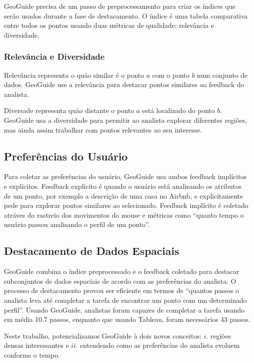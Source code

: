 GeoGuide precisa de um passo de preprocessamento para criar os índices que serão usados durante a fase de destacamento. O índice é uma tabela comparativa entre todos os pontos usando duas métricas de qualidade: relevância e diversidade.

\subsubsection{Relevância e Diversidade}

Relevância representa o quão similar é o ponto $a$ com o ponto $b$ num conjunto de dados. GeoGuide use a relevância para destacar pontos similares ao feedback do analista.


Diversade representa quão distante o ponto $a$ está localizado do ponto $b$. GeoGuide usa a diversidade para permitir ao analista explorar diferentes regiões, mas ainda assim trabalhar com pontos relevantes ao seu interesse.


\subsection{Preferências do Usuário}

Para coletar as preferências do usuário, GeoGuide usa ambos feedback implícitos e explícitos. Feedback explícito é quando o usuário está analisando os atributos de um ponto, por exemplo a descrição de uma casa no Airbnb, e explicitamente pede para explorar pontos similares ao selecionado. Feedback implícito é coletado atráves do rastreio dos movimentos do mouse e métricas como  ``quanto tempo o usuário passou analisando o perfil de um ponto''.

\subsection{Destacamento de Dados Espaciais}

GeoGuide combina o índice preprocessado e o feedback coletado para destacar subconjuntos de dados espaciais de acordo com as preferências do analista. O processo de destacamento provou ser eficiente em termos de ``quantos passos o analista leva até completar a tarefa de encontrar um ponto com um determinado perfil''. Usando GeoGuide, analistas foram capazes de completar a tarefa usando em média 10.7 passos, enquanto que usando Tableau, foram necessários 43 passos.

\vspace{25pt}

\noindent Neste trabalho, potencializamos GeoGuide à dois novos conceitos: $i$. regiões densas interessantes e $ii$. entendendo como as preferências do analista evoluem conforme o tempo.